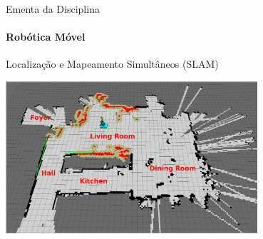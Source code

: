 \documentclass{beamer}
\begin{document}
\begin{frame}[c]{Ementa da Disciplina}
	\framesubtitle{Robótica Móvel}
	\begin{block}{Localização e Mapeamento Simultâneos (SLAM)}
	\end{block}
	\begin{center}
		\includegraphics[width=0.7\textwidth]{./images/slam-example.png}
	\end{center}
\end{frame}
\end{document}
